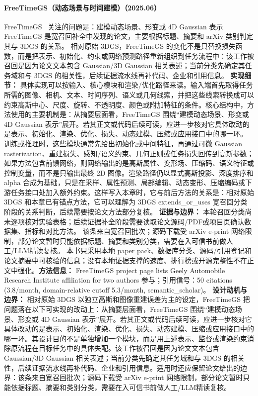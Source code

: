 \paragraph{FreeTimeGS（动态场景与时间建模）（2025.06）}
FreeTimeGS~\cite{2506_05348} 关注的问题是：建模动态场景、形变或 4D Gaussian 表示 FreeTimeGS 是宽召回补全中发现的论文，主要根据标题、摘要和 arXiv 类别判定其与 3DGS 的关系。
相对原始 3DGS，FreeTimeGS 的变化不是只替换损失函数，而是把表示、初始化、约束或网络预测路径重新组织到任务流程中：该工作被召回是因为论文文本包含 Gaussian/3D Gaussian 相关表述；当前分类先确定其任务域和与 3DGS 的相关性，后续证据流水线再补代码、企业和引用信息。
\textbf{实现细节：} 具体实现可以按输入、核心模块和渲染/优化路径来读。输入端首先取得任务所需的图像、相机、文本、时间序列、语义或几何线索，并把这些线索转换成可以约束高斯中心、尺度、旋转、不透明度、颜色或附加特征的条件。核心结构中，方法使用的主要机制是：从摘要层面看，FreeTimeGS 围绕“建模动态场景、形变或 4D Gaussian 表示”展开。若其正文或代码后续可读，应进一步核对它具体改动的是表示、初始化、渲染、优化、损失、动态建模、压缩或应用接口中的哪一环。 训练或推理时，这些模块通常先给出初始化或中间特征，再通过可微 Gaussian rasterization、重建损失、感知/语义约束、几何正则或任务损失回传到高斯参数；如果方法包含前馈网络，则网络输出的是高斯属性、变形场、压缩码、语义特征或控制变量，而不是只输出最终 2D 图像。渲染路径仍以显式高斯投影、深度排序和 alpha 合成为基础，只是在采样、属性预测、局部编辑、动态变形、压缩编码或下游任务接口处加入额外约束。这样写入本章时，它与前后方法的关系是：相对原始 3DGS 和本章已有锚点方法，它可以理解为 3DGS extends\_or\_uses 宽召回分类阶段的关系判断，后续需要按论文方法部分复核。
\textbf{证据与边界：} 本轮召回分类尚未逐项核对实验表格；后续证据补全阶段需要读取论文源码/PDF或项目页确认数据集、指标和对比方法。 该条来自宽召回批次；源码下载受 arXiv e-print 网络限制，部分论文暂时只能依据标题、摘要和类别分类，需要在入可信书前做人工/LLM精读复核。 本书只采用本地 paper pack、数据库分类、源码/引用登记和论文摘要中可核验的信息；没有本地证据支撑的速度、排行榜或开源完整性不在正文中强化。\textbf{方法信息：} FreeTimeGS project page lists Geely Automobile Research Institute affiliation for two authors 参与；引用信号：50 citations (3.8/month, domain-relative cutoff 5.3/month, semantic\_scholar)。
\textbf{设计动机与边界：} 相对原始 3DGS 以独立高斯和图像重建误差为主的设定，FreeTimeGS 把问题落在以下可实现的改动上：从摘要层面看，FreeTimeGS 围绕“建模动态场景、形变或 4D Gaussian 表示”展开。若其正文或代码后续可读，应进一步核对它具体改动的是表示、初始化、渲染、优化、损失、动态建模、压缩或应用接口中的哪一环。其设计目的不是单独增加一个模块，而是用上述表示、监督或渲染约束消除原流程在目标任务中的具体失配。该工作被召回是因为论文文本包含 Gaussian/3D Gaussian 相关表述；当前分类先确定其任务域和与 3DGS 的相关性，后续证据流水线再补代码、企业和引用信息。适用时还应保留论文给出的边界：该条来自宽召回批次；源码下载受 arXiv e-print 网络限制，部分论文暂时只能依据标题、摘要和类别分类，需要在入可信书前做人工/LLM精读复核。
